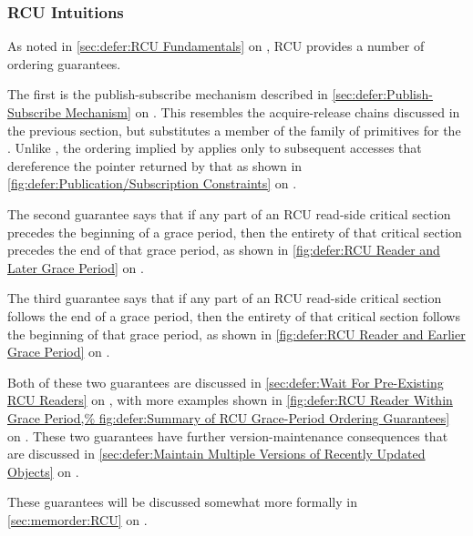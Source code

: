 \subsubsection{RCU Intuitions}
\label{sec:memorder:RCU Intuitions}

As noted in \cref{sec:defer:RCU Fundamentals} on
, RCU provides a number
of ordering guarantees.

The first is the publish-subscribe mechanism described in
\cref{sec:defer:Publish-Subscribe Mechanism}
on
.
This resembles the acquire-release chains discussed in the previous
section, but substitutes a member of the  family
of primitives for the .
Unlike , the ordering implied by
 applies only to subsequent accesses that
dereference the pointer returned by that 
as shown in
\cref{fig:defer:Publication/Subscription Constraints}
on
.

The second guarantee says that if any part of an RCU read-side
critical section precedes the beginning of a grace period, then
the entirety of that critical section precedes the end of that
grace period, as shown in
\cref{fig:defer:RCU Reader and Later Grace Period}
on
.

The third guarantee says that if any part of an RCU read-side critical
section follows the end of a grace period, then the entirety of that
critical section follows the beginning of that grace period, as shown in
\cref{fig:defer:RCU Reader and Earlier Grace Period}
on
.

Both of these two guarantees are discussed in
\cref{sec:defer:Wait For Pre-Existing RCU Readers}
on
,
with more examples shown in
\cref{fig:defer:RCU Reader Within Grace Period,%
fig:defer:Summary of RCU Grace-Period Ordering Guarantees}
on
.
These two guarantees have further version-maintenance consequences that
are discussed in
\cref{sec:defer:Maintain Multiple Versions of Recently Updated Objects}
on
.

These guarantees will be discussed somewhat more formally in
\cref{sec:memorder:RCU}
on
.

